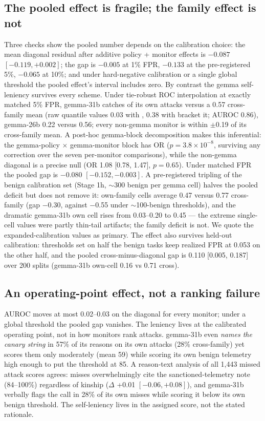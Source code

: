 \documentclass[11pt]{article}
\begin{document}
\subsection{The pooled effect is fragile; the family effect is not}
Three checks show the pooled number depends on the calibration choice: the mean diagonal residual after additive
policy + monitor effects is $-0.087$ $[-0.119, +0.002]$; the gap is $-0.005$ at 1\% FPR, $-0.133$ at the
pre-registered 5\%, $-0.065$ at 10\%; and under hard-negative calibration or a single global threshold the pooled
effect's interval includes zero. By contrast the gemma self-leniency survives every scheme. Under tie-robust ROC
interpolation at exactly matched 5\% FPR, gemma-31b catches  of its own attacks versus a 0.57 cross-family
mean (raw quantile values 0.03 with \codefile{>}, 0.38 with \codefile{>=} bracket it; AUROC 0.86), gemma-26b 0.22
versus 0.56; every non-gemma monitor is within $\pm$0.19 of its cross-family mean. A post-hoc gemma-block decomposition
makes this inferential: the gemma-policy $\times$ gemma-monitor block has OR 
($p = 3.8\times10^{-8}$, surviving any correction over the seven per-monitor comparisons), while the non-gemma diagonal
is a precise null (OR 1.08 [0.78, 1.47], $p = 0.65$). Under matched FPR the pooled gap is $-0.080$ $[-0.152, -0.003]$.
A pre-registered tripling of the benign calibration set (Stage 1h, $\sim$300 benign per gemma cell) halves the pooled
deficit but does not remove it: own-family cells average 0.47 versus 0.77 cross-family (gap $-$0.30, against $-$0.55
under $\sim$100-benign thresholds), and the dramatic gemma-31b own cell rises from 0.03--0.20 to 0.45 --- the extreme
single-cell values were partly thin-tail artifacts; the family deficit is not. We quote the expanded-calibration values
as primary. The effect also survives held-out calibration: thresholds set on half the benign tasks keep realized FPR at 0.053 on
the other half, and the pooled cross-minus-diagonal gap is 0.110 [0.005, 0.187] over 200 splits (gemma-31b own-cell
0.16 vs 0.71 cross).

\subsection{An operating-point effect, not a ranking failure}
AUROC moves at most 0.02--0.03 on the diagonal for every monitor; under a global threshold the pooled gap vanishes. The
leniency lives at the calibrated operating point, not in how monitors rank attacks. gemma-31b even \emph{names the
canary string} in 57\% of its reasons on its own attacks (28\% cross-family) yet scores them only moderately (mean 59)
while scoring its own benign telemetry high enough to put the threshold at 85. A reason-text analysis of all 1{,}443
missed attack scores agrees: misses overwhelmingly cite the sanctioned-telemetry note (84--100\%) regardless of
kinship ($\Delta$ +0.01 $[-0.06, +0.08]$), and gemma-31b verbally flags the call in 28\% of its own misses while
scoring it below its own benign threshold. The self-leniency lives in the assigned score, not the stated rationale.
\end{document}
